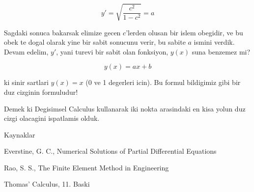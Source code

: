 \documentclass[12pt,fleqn]{article}
\begin{document}
\[ y' = \sqrt{\frac{c^2}{1-c^2}} = a \]

Sagdaki sonuca bakarsak elimize gecen $c$'lerden olusan bir islem obegidir, ve
bu obek te dogal olarak yine bir sabit sonucunu verir, bu sabite $a$ ismini
verdik. Devam edelim, $y'$, yani turevi bir sabit olan fonksiyon, $y(x)$ suna
benzemez mi?

\[ y(x) = ax + b \]

ki sinir sartlari $y(x)=x$ (0 ve 1 degerleri icin). Bu formul bildigimiz
gibi bir duz cizginin formuludur! 

Demek ki Degisimsel Calculus kullanarak iki nokta arasindaki en kisa yolun duz
cizgi olacagini ispatlamis olduk.

Kaynaklar

Everstine, G. C., Numerical Solutions of Partial Differential Equations

Rao, S. S., The Finite Element Method in Engineering

Thomas' Calculus, 11. Baski
\end{document}
